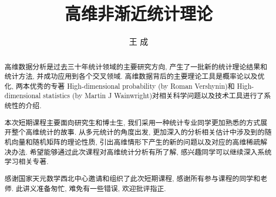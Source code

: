 \documentclass[11pt]{article}
\begin{document}
	\begin{CJK}{UTF8}{gkai}
\title{高维非渐近统计理论}
\author{王 成 }
\date{}
\maketitle

\maketitle
\begin{abstract}
高维数据分析是过去三十年统计领域的主要研究方向, 产生了一批新的统计理论结果和统计方法, 并成功应用到各个交叉领域. 高维数据背后的主要理论工具是概率论以及优化, 两本优秀的专著 High-dimensional probability (by Roman Vershynin)和 High-dimensional statistics (by Martin J  Wainwright)对相关科学问题以及技术工具进行了系统性的介绍. 

本次短期课程主要面向研究生和博士生, 我们采用一种统计专业同学更加熟悉的方式展开整个高维统计的故事. 从多元统计的角度出发, 更加深入的分析相关估计中涉及到的随机向量和随机矩阵的理论性质, 引出高维情形下产生的新的问题以及对应的高维稀疏解决办法. 希望能够通过此次课程对高维统计分析有所了解, 感兴趣同学可以继续深入系统学习相关专著.  


感谢国家天元数学西北中心邀请和组织了此次短期课程, 感谢所有参与课程的同学和老师. 此讲义准备匆忙, 难免有一些错误, 欢迎批评指正.
\end{abstract}
\tableofcontents







	 
	
\end{CJK}
\end{document}

